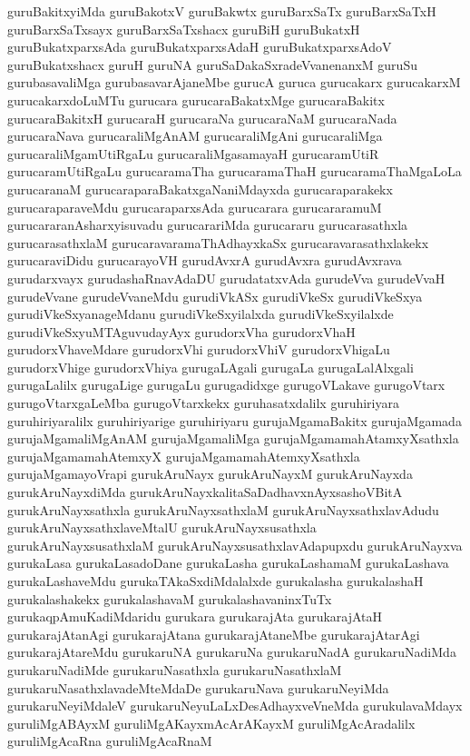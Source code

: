 {guruBakitxyiMda
guruBakotxV
guruBakwtx
guruBarxSaTx
guruBarxSaTxH
guruBarxSaTxsayx
guruBarxSaTxshacx
guruBiH
guruBukatxH
guruBukatxparxsAda
guruBukatxparxsAdaH
guruBukatxparxsAdoV
guruBukatxshacx
guruH
guruNA
guruSaDakaSxradeVvanenanxM
guruSu
gurubasavaliMga
gurubasavarAjaneMbe
gurucA
guruca
gurucakarx
gurucakarxM
gurucakarxdoLuMTu
gurucara
gurucaraBakatxMge
gurucaraBakitx
gurucaraBakitxH
gurucaraH
gurucaraNa
gurucaraNaM
gurucaraNada
gurucaraNava
gurucaraliMgAnAM
gurucaraliMgAni
gurucaraliMga
gurucaraliMgamUtiRgaLu
gurucaraliMgasamayaH
gurucaramUtiR
gurucaramUtiRgaLu
gurucaramaTha
gurucaramaThaH
gurucaramaThaMgaLoLa
gurucaranaM
gurucaraparaBakatxgaNaniMdayxda
gurucaraparakekx
gurucaraparaveMdu
gurucaraparxsAda
gurucarara
gurucararamuM
gurucararanAsharxyisuvadu
gurucarariMda
gurucararu
gurucarasathxla
gurucarasathxlaM
gurucaravaramaThAdhayxkaSx
gurucaravarasathxlakekx
gurucaraviDidu
gurucarayoVH
gurudAvxrA
gurudAvxra
gurudAvxrava
gurudarxvayx
gurudashaRnavAdaDU
gurudatatxvAda
gurudeVva
gurudeVvaH
gurudeVvane
gurudeVvaneMdu
gurudiVkASx
gurudiVkeSx
gurudiVkeSxya
gurudiVkeSxyanageMdanu
gurudiVkeSxyilalxda
gurudiVkeSxyilalxde
gurudiVkeSxyuMTAguvudayAyx
gurudorxVha
gurudorxVhaH
gurudorxVhaveMdare
gurudorxVhi
gurudorxVhiV
gurudorxVhigaLu
gurudorxVhige
gurudorxVhiya
gurugaLAgali
gurugaLa
gurugaLalAlxgali
gurugaLalilx
gurugaLige
gurugaLu
gurugadidxge
gurugoVLakave
gurugoVtarx
gurugoVtarxgaLeMba
gurugoVtarxkekx
guruhasatxdalilx
guruhiriyara
guruhiriyaralilx
guruhiriyarige
guruhiriyaru
gurujaMgamaBakitx
gurujaMgamada
gurujaMgamaliMgAnAM
gurujaMgamaliMga
gurujaMgamamahAtamxyXsathxla
gurujaMgamamahAtemxyX
gurujaMgamamahAtemxyXsathxla
gurujaMgamayoVrapi
gurukAruNayx
gurukAruNayxM
gurukAruNayxda
gurukAruNayxdiMda
gurukAruNayxkalitaSaDadhavxnAyxsashoVBitA
gurukAruNayxsathxla
gurukAruNayxsathxlaM
gurukAruNayxsathxlavAdudu
gurukAruNayxsathxlaveMtalU
gurukAruNayxsusathxla
gurukAruNayxsusathxlaM
gurukAruNayxsusathxlavAdapupxdu
gurukAruNayxva
gurukaLasa
gurukaLasadoDane
gurukaLasha
gurukaLashamaM
gurukaLashava
gurukaLashaveMdu
gurukaTAkaSxdiMdalalxde
gurukalasha
gurukalashaH
gurukalashakekx
gurukalashavaM
gurukalashavaninxTuTx
gurukaqpAmuKadiMdaridu
gurukara
gurukarajAta
gurukarajAtaH
gurukarajAtanAgi
gurukarajAtana
gurukarajAtaneMbe
gurukarajAtarAgi
gurukarajAtareMdu
gurukaruNA
gurukaruNa
gurukaruNadA
gurukaruNadiMda
gurukaruNadiMde
gurukaruNasathxla
gurukaruNasathxlaM
gurukaruNasathxlavadeMteMdaDe
gurukaruNava
gurukaruNeyiMda
gurukaruNeyiMdaleV
gurukaruNeyuLaLxDesAdhayxveVneMda
gurukulavaMdayx
guruliMgABAyxM
guruliMgAKayxmAcArAKayxM
guruliMgAcAradalilx
guruliMgAcaRna
guruliMgAcaRnaM
}
